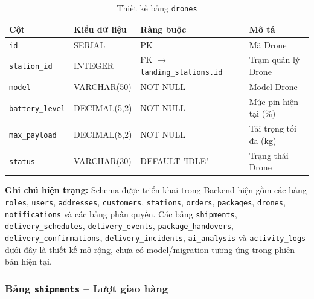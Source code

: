 \begin{table}[H]
\centering
\caption{Thiết kế bảng \texttt{drones}}
\begin{tabularx}{\textwidth}{|l|l|Z|Z|}
\hline
\textbf{Cột} &
\textbf{Kiểu dữ liệu} &
\textbf{Ràng buộc} &
\textbf{Mô tả} \\ \hline

\texttt{id}
& SERIAL
& PK
& Mã Drone \\ \hline

\texttt{station\_id}
& INTEGER
& FK $\rightarrow$ \texttt{landing\_stations.id}
& Trạm quản lý Drone \\ \hline

\texttt{model}
& VARCHAR(50)
& NOT NULL
& Model Drone \\ \hline

\texttt{battery\_level}
& DECIMAL(5,2)
& NOT NULL
& Mức pin hiện tại (\%) \\ \hline

\texttt{max\_payload}
& DECIMAL(8,2)
& NOT NULL
& Tải trọng tối đa (kg) \\ \hline

\texttt{status}
& VARCHAR(30)
& DEFAULT 'IDLE'
& Trạng thái Drone \\ \hline

\end{tabularx}
\end{table}


\textbf{Ghi chú hiện trạng:} Schema được triển khai trong Backend hiện gồm các bảng \texttt{roles}, \texttt{users}, \texttt{addresses}, \texttt{customers}, \texttt{stations}, \texttt{orders}, \texttt{packages}, \texttt{drones}, \texttt{notifications} và các bảng phân quyền. Các bảng \texttt{shipments}, \texttt{delivery\_schedules}, \texttt{delivery\_events}, \texttt{package\_handovers}, \texttt{delivery\_confirmations}, \texttt{delivery\_incidents}, \texttt{ai\_analysis} và \texttt{activity\_logs} dưới đây là thiết kế mở rộng, chưa có model/migration tương ứng trong phiên bản hiện tại.

\iffalse


\subsubsection{Bảng \texttt{shipments} -- Lượt giao hàng}

